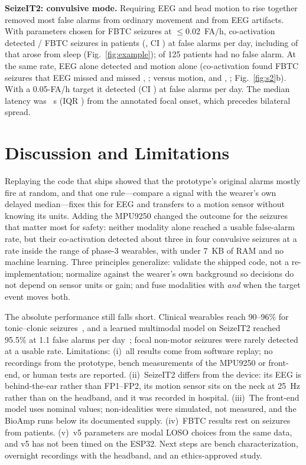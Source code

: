 \documentclass[conference,letterpaper]{IEEEtran}
\begin{document}
\textbf{SeizeIT2: convulsive mode.} Requiring EEG and head motion to rise together removed most false alarms from ordinary movement and from EEG artifacts. With parameters chosen for FBTC seizures at $\le$0.02~FA/h, co-activation detected \SCvADet{}/\SCvAN{} FBTC seizures in \SCvASubj{} patients (\SCvASens{}, CI \SCvACI{}) at \SCvAFAday{} false alarms per day, including \SCvASleepDet{} of \SCvASleepN{} that arose from sleep (Fig.~\ref{fig:example}); \SCvAZeroFA{} of 125 patients had no false alarm. At the same rate, EEG alone detected \SCvEegSens{} and motion alone \SCvMovSens{} (co-activation found \SMcEegOnly{} FBTC seizures that EEG missed and missed \SMcEegOther{}, \SMcEegP{}; versus motion, \SMcMovOnly{} and \SMcMovOther{}, \SMcMovP{}; Fig.~\ref{fig:s2}b). With a 0.05-FA/h target it detected \SCvBSens{} (CI \SCvBCI{}) at \SCvBFAday{} false alarms per day. The median latency was \SCvALat{}~s (IQR \SCvALatIQR{}) from the annotated focal onset, which precedes bilateral spread.

\section{Discussion and Limitations}
Replaying the code that ships showed that the prototype's original alarms mostly fire at random, and that one rule---compare a signal with the wearer's own delayed median---fixes this for EEG and transfers to a motion sensor without knowing its units. Adding the MPU9250 changed the outcome for the seizures that matter most for safety: neither modality alone reached a usable false-alarm rate, but their co-activation detected about three in four convulsive seizures at a rate inside the range of phase-3 wearables, with under 7~KB of RAM and no machine learning. Three principles generalize: validate the shipped code, not a re-implementation; normalize against the wearer's own background so decisions do not depend on sensor units or gain; and fuse modalities with \emph{and} when the target event moves both.

The absolute performance still falls short. Clinical wearables reach 90--96\% for tonic--clonic seizures~\cite{beniczky2021guideline}, and a learned multimodal model on SeizeIT2 reached 95.5\% at 1.1 false alarms per day~\cite{zhang2024multimodal}; focal non-motor seizures were rarely detected at a usable rate. Limitations: (i)~all results come from software replay; no recordings from the prototype, bench measurements of the MPU9250 or front-end, or human tests are reported. (ii)~SeizeIT2 differs from the device: its EEG is behind-the-ear rather than FP1--FP2, its motion sensor sits on the neck at 25~Hz rather than on the headband, and it was recorded in hospital. (iii)~The front-end model uses nominal values; non-idealities were simulated, not measured, and the BioAmp runs below its documented supply. (iv)~FBTC results rest on \SCvAN{} seizures from \SCvASubj{} patients. (v)~v5 parameters are modal LOSO choices from the same data, and v5 has not been timed on the ESP32. Next steps are bench characterization, overnight recordings with the headband, and an ethics-approved study.
\end{document}
